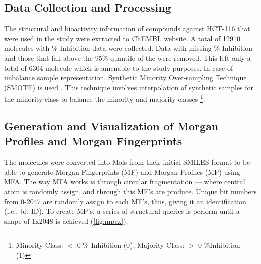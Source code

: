 \setlength{\parindent}{0pt}

\subsection*{Data Collection and Processing}
The structural and bioactivity information of compounds against HCT-116 that were used in the study were extracted to ChEMBL website. A total of   12910 molecules with \% Inhibition data were collected. Data with missing \% Inhibition and those that fall above the 95\% quantile of the were removed. This left only a total of 6304 molecule which is amenable to the study purposes. In case of imbalance sample representation, Synthetic Minority Over-sampling Technique (SMOTE) is used \cite{gomatam2024SMOTE}. This technique involves interpolation of synthetic samples for the minority class to balance the minority and majority classes \footnote{Minority Class: $<$ 0 \% Inhibition (0), Majority Class: $>$ 0 \%Inhibition (1)}.   



\subsection*{Generation and Visualization of Morgan Profiles and Morgan Fingerprints}

The molecules were converted into Mols from their initial SMILES format to be able to generate Morgan Fingerprints (MF) and Morgan Profiles (MP) using MFA. The way MFA works is through circular fragmentation --- where central atom is randomly assign, and through this MF's are produce. Unique bit numbers from 0-2047 are randomly assign to each MF's, thus, giving it an identification (i.e., bit ID). To create MP's, a series of structural queries is perform until a shape of 1x2048 is achieved (\autoref{fig:mpex}).

